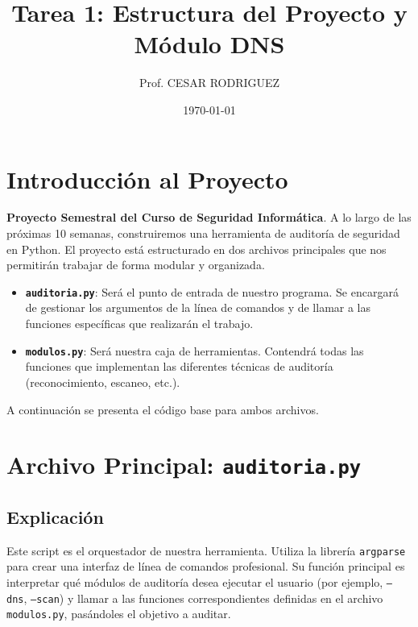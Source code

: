 \documentclass[12pt]{article}
\title{Tarea 1: Estructura del Proyecto y Módulo DNS}
\author{Prof. CESAR RODRIGUEZ}
\date{\today}
\begin{document}
\maketitle

\section{Introducción al Proyecto}

\textbf{Proyecto Semestral del Curso de Seguridad Informática}. A lo largo de las próximas 10 semanas, construiremos una herramienta de auditoría de seguridad en Python. El proyecto está estructurado en dos archivos principales que nos permitirán trabajar de forma modular y organizada.

\begin{itemize}
    \item \textbf{\texttt{auditoria.py}}: Será el punto de entrada de nuestro programa. Se encargará de gestionar los argumentos de la línea de comandos y de llamar a las funciones específicas que realizarán el trabajo.
    \item \textbf{\texttt{modulos.py}}: Será nuestra caja de herramientas. Contendrá todas las funciones que implementan las diferentes técnicas de auditoría (reconocimiento, escaneo, etc.).
\end{itemize}

A continuación se presenta el código base para ambos archivos.

\section{Archivo Principal: \texttt{auditoria.py}}
\subsection*{Explicación}
Este script es el orquestador de nuestra herramienta. Utiliza la librería \texttt{argparse} para crear una interfaz de línea de comandos profesional. Su función principal es interpretar qué módulos de auditoría desea ejecutar el usuario (por ejemplo, \texttt{--dns}, \texttt{--scan}) y llamar a las funciones correspondientes definidas en el archivo \texttt{modulos.py}, pasándoles el objetivo a auditar.
\end{document}

